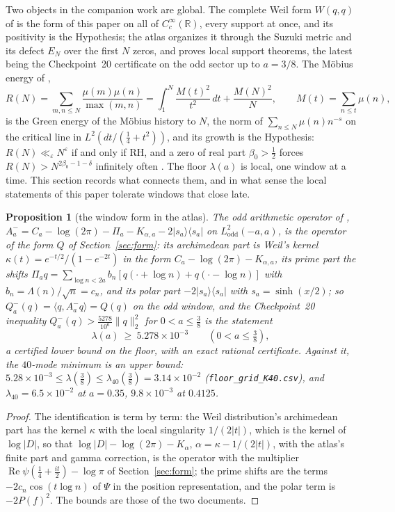 \documentclass[11pt]{article}
\newtheorem{proposition}[theorem]{Proposition}
\theoremstyle{definition}
\theoremstyle{remark}
\newcommand{\R}{\mathbb{R}}
\DeclareMathOperator{\Ree}{Re}
\begin{document}
Two objects in the companion work are global. The complete Weil form $W(q,q)$ of \cite{michaels-atlas} is the form of this paper on all of $C_c^\infty(\R)$, every support at once, and its positivity is the Hypothesis; the atlas organizes it through the Suzuki metric and its defect $E_N$ over the first $N$ zeros, and proves local support theorems, the latest being the Checkpoint~20 certificate on the odd sector up to $a=3/8$. The M\"obius energy of \cite{michaels-mobius},
\[
R(N)=\sum_{m,n\le N}\frac{\mu(m)\mu(n)}{\max(m,n)}=\int_1^N\frac{M(t)^2}{t^2}\,dt+\frac{M(N)^2}N,\qquad M(t)=\sum_{n\le t}\mu(n),
\]
is the Green energy of the M\"obius history to $N$, the norm of $\sum_{n\le N}\mu(n)n^{-s}$ on the critical line in $L^2(dt/(\tfrac14+t^2))$, and its growth is the Hypothesis: $R(N)\ll_\varepsilon N^\varepsilon$ if and only if RH, and a zero of real part $\beta_0>\tfrac12$ forces $R(N)>N^{2\beta_0-1-\delta}$ infinitely often \cite[Theorem~12.6]{michaels-mobius}. The floor $\lambda(a)$ is local, one window at a time. This section records what connects them, and in what sense the local statements of this paper tolerate windows that close late.

\begin{proposition}[the window form in the atlas]\label{prop:atlas}
The odd arithmetic operator of \cite[CP19 (0.5)]{michaels-atlas}, $A_a^-=C_a-\log(2\pi)-\Pi_a-K_{\alpha,a}-2|s_a\rangle\langle s_a|$ on $L^2_{\mathrm{odd}}(-a,a)$, is the operator of the form $Q$ of Section~\ref{sec:form}: its archimedean part is Weil's kernel $\kappa(t)=e^{-t/2}/(1-e^{-2t})$ in the form $C_a-\log(2\pi)-K_{\alpha,a}$, its prime part the shifts $\Pi_aq=\sum_{\log n<2a}b_n[q(\cdot+\log n)+q(\cdot-\log n)]$ with $b_n=\Lambda(n)/\sqrt n=c_n$, and its polar part $-2|s_a\rangle\langle s_a|$ with $s_a=\sinh(x/2)$; so $Q_a^-(q)=\langle q,A_a^-q\rangle=Q(q)$ on the odd window, and the Checkpoint~20 inequality $Q_a^-(q)>\tfrac{5278}{10^6}\|q\|_2^2$ for $0<a\le\tfrac38$ \cite[CP20 (0.1)]{michaels-atlas} is the statement
\[
\lambda(a)\ \ge\ 5.278\times10^{-3}\qquad(0<a\le\tfrac38),
\]
a certified lower bound on the floor, with an exact rational certificate. Against it, the $40$-mode minimum is an upper bound: $5.28\times10^{-3}\le\lambda(\tfrac38)\le\lambda_{40}(\tfrac38)=3.14\times10^{-2}$ (\texttt{floor\_grid\_K40.csv}), and $\lambda_{40}=6.5\times10^{-2}$ at $a=0.35$, $9.8\times10^{-3}$ at $0.4125$.
\end{proposition}
\begin{proof}
The identification is term by term: the Weil distribution's archimedean part has the kernel $\kappa$ with the local singularity $1/(2|t|)$, which is the kernel of $\log|D|$, so that $\log|D|-\log(2\pi)-K_\alpha$, $\alpha=\kappa-1/(2|t|)$, with the atlas's finite part and gamma correction, is the operator with the multiplier $\Ree\psi(\tfrac14+\tfrac{it}2)-\log\pi$ of Section~\ref{sec:form}; the prime shifts are the terms $-2c_n\cos(t\log n)$ of $\Psi$ in the position representation, and the polar term is $-2P(f)^2$. The bounds are those of the two documents.
\end{proof}
\end{document}
